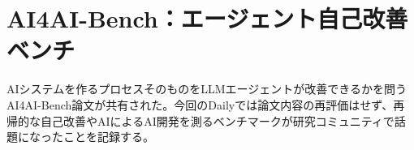 \section{AI4AI-Bench：エージェント自己改善ベンチ}

AIシステムを作るプロセスそのものをLLMエージェントが改善できるかを問うAI4AI-Bench論文が共有された。今回のDailyでは論文内容の再評価はせず、再帰的な自己改善やAIによるAI開発を測るベンチマークが研究コミュニティで話題になったことを記録する。


